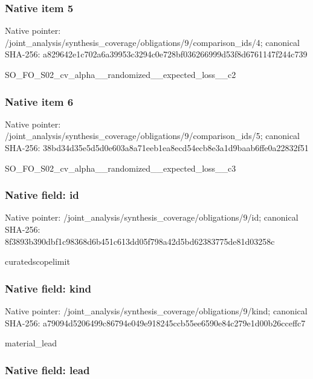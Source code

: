 \documentclass[10pt,a4paper]{article}
\begin{document}
\subsubsection{Native item 5}


Native pointer: /joint\_analysis/synthesi\allowbreak{}s\_coverage/obligations/9\allowbreak{}/comparison\_ids/4; canonical SHA-256: a829642e1c702a6a39953c32\allowbreak{}94c0e728bf036266999d53f8\allowbreak{}d6761147f244c739


SO\_FO\_S02\_cv\_alpha\_\_rand\allowbreak{}omized\_\_expected\_loss\_\_c\allowbreak{}2


\subsubsection{Native item 6}


Native pointer: /joint\_analysis/synthesi\allowbreak{}s\_coverage/obligations/9\allowbreak{}/comparison\_ids/5; canonical SHA-256: 38bd34d35e5d5d0e603a8a71\allowbreak{}eeb1ea8ecd54ecb8e3a1d9ba\allowbreak{}ab6ffe0a22832f51


SO\_FO\_S02\_cv\_alpha\_\_rand\allowbreak{}omized\_\_expected\_loss\_\_c\allowbreak{}3


\subsubsection{Native field: id}


Native pointer: /joint\_analysis/synthesi\allowbreak{}s\_coverage/obligations/9\allowbreak{}/id; canonical SHA-256: 8f3893b390dbf1c98368d6b4\allowbreak{}51c613dd05f798a42d5bd623\allowbreak{}83775de81d03258c


curatedscopelimit


\subsubsection{Native field: kind}


Native pointer: /joint\_analysis/synthesi\allowbreak{}s\_coverage/obligations/9\allowbreak{}/kind; canonical SHA-256: a79094d5206499c86794e049\allowbreak{}e918245ccb55ee6590e84c27\allowbreak{}9e1d00b26cceffc7


material\_lead


\subsubsection{Native field: lead}
\end{document}
